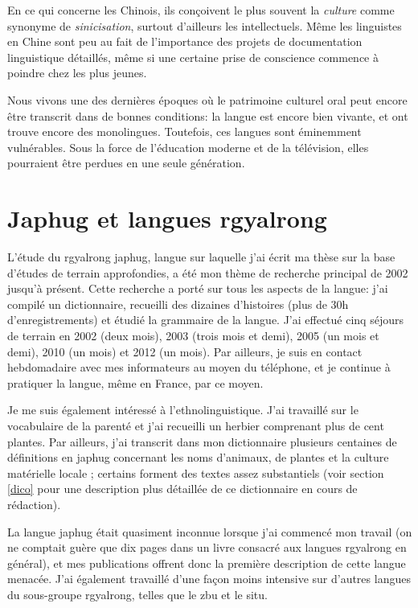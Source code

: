 \documentclass[oldfontcommands,oneside,a4paper,11pt]{memoir}
\begin{document}
En ce qui concerne les Chinois,  ils conçoivent le plus souvent la \textit{culture} comme synonyme de \textit{sinicisation}, surtout d'ailleurs les intellectuels. Même les linguistes en Chine sont peu au fait de l'importance des projets de documentation linguistique détaillés, même si une certaine prise de conscience commence à poindre chez les plus jeunes.

Nous vivons une des dernières époques où le patrimoine culturel oral peut encore être transcrit dans de bonnes conditions: la langue est encore bien vivante, et ont trouve encore des monolingues. Toutefois, ces langues sont éminemment vulnérables. Sous la force de l'éducation moderne et de la télévision, elles pourraient être perdues en une seule génération. 


\section{Japhug et langues rgyalrong}
	L’étude du rgyalrong japhug, langue sur laquelle j’ai écrit ma thèse sur la base d’études de terrain approfondies, a été mon thème de recherche principal de 2002 jusqu’à présent. Cette recherche a porté sur tous les aspects de la langue: j’ai compilé un dictionnaire, recueilli des dizaines d’histoires (plus de 30h d’enregistrements) et étudié la grammaire de la langue. J’ai effectué cinq séjours de terrain en 2002 (deux mois), 2003 (trois mois et demi), 2005 (un mois et demi), 2010 (un mois) et 2012 (un mois). Par ailleurs, je suis en contact hebdomadaire avec mes informateurs au moyen du téléphone, et je continue à pratiquer la langue, même en France, par ce moyen.
	
	
Je me suis également intéressé à l’ethnolinguistique. J’ai travaillé sur le vocabulaire de la parenté et j’ai recueilli un herbier comprenant plus de cent plantes. Par ailleurs, j’ai transcrit dans mon dictionnaire plusieurs centaines de définitions en japhug concernant les noms d’animaux, de plantes et la culture matérielle locale ; certains forment des textes assez substantiels   (voir section \ref{dico} pour une description plus détaillée de ce dictionnaire en cours de rédaction).

 La langue japhug était quasiment inconnue lorsque j’ai commencé mon travail (on ne comptait guère que dix pages dans un livre consacré aux langues rgyalrong en général), et mes publications offrent donc la première description de cette langue menacée. J’ai également travaillé d’une façon moins intensive sur d’autres langues du sous-groupe rgyalrong, telles que le zbu et le situ. 
\end{document}
